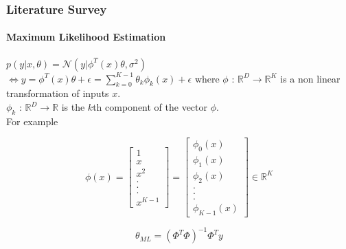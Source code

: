 \documentclass[handout,9pt]{beamer}
\numberwithin{theorem}{section}
\begin{document}
\begin{frame}
	\begin{spacing}{1}
		\frametitle{Literature Survey}
		\framesubtitle{Maximum Likelihood Estimation}
		$p(y|x,\theta) = \mathcal{N}(y|\phi^T(x)\theta, \sigma^2)$\\
		$\Leftrightarrow y = \phi^T(x)\theta + \epsilon = \sum_{k=0}^{K-1}\theta_{k}\phi_{k}(x) +\epsilon$
		where $\phi$ : $\mathbb{R}^D \rightarrow \mathbb{R}^K$ is a non linear transformation of inputs $x$.\\
		$\phi_{k}$ : $\mathbb{R}^D \rightarrow \mathbb{R}$ is the $k$th component of the vector $\phi$.\\
		\pause For example\\
		\begin{tiny}
			\begin{equation*}
				\phi(x) = \begin{bmatrix}
					1\\ x\\ x^2\\ .\\ .\\ .\\ x^{K-1}
				\end{bmatrix}
				= \begin{bmatrix}
					\phi_{0}(x)\\ \phi_{1}(x)\\ \phi_{2}(x)\\ .\\ .\\ .\\ \phi_{K-1}(x)
				\end{bmatrix} \in \mathbb{R}^K
			\end{equation*}
		\end{tiny}\pause
	\begin{equation*}
		\boxed{\theta_{ML} = (\Phi^T\Phi)^{-1}\Phi^Ty}  
	\end{equation*}
	\end{spacing}
\end{frame}
\end{document}
